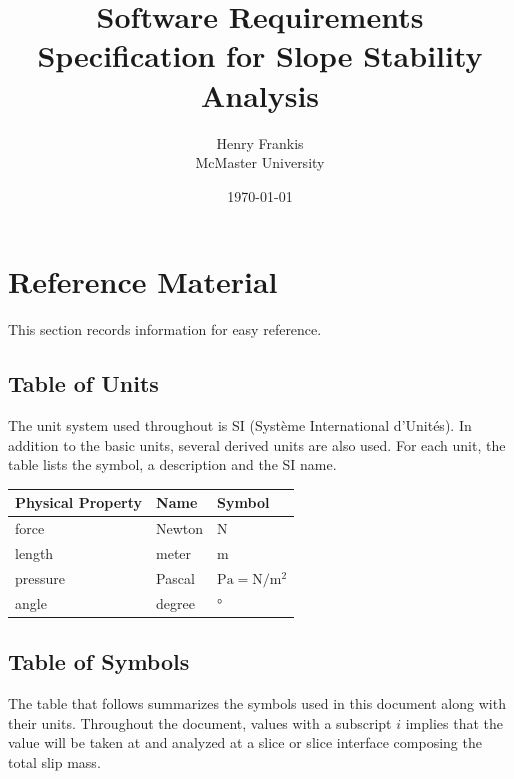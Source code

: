 \documentclass[12pt]{article}
\renewcommand{\arraystretch}{1}
\begin{document}
\title{Software Requirements Specification for Slope Stability Analysis}
\author{Henry Frankis\\McMaster University}
\date{\today}
	
\maketitle
\tableofcontents

\section{Reference Material}
This section records information for easy reference.
\subsection{Table of Units}

The unit system used throughout is SI (Syst\`{e}me International d'Unit\'{e}s). In
 addition to the basic units, several derived units are also used. For each unit, the table
 lists the symbol, a description and the SI name.
\newline

\renewcommand{\arraystretch}{1.2}
\setlength{\tabcolsep}{20pt}
\begin{tabular}{  l  l  l  }
\hline
\textbf{Physical Property} & \textbf{Name} & \textbf{Symbol} \\
\hline
force & Newton & \si{\newton} \\
length & meter & \si{\meter}  \\
pressure & Pascal & $\si{\pascal}=\si{\newton\per\square\meter}$ \\
angle & degree & \si{\degree}  \\
\hline
\end{tabular}
\renewcommand{\arraystretch}{1}


\subsection{Table of Symbols}


The table that follows summarizes the symbols used in this document along with their units. 
Throughout the document, values with a subscript $i$ implies that the value will be taken at
 and analyzed at a slice or slice interface composing the total slip mass.
\end{document}
